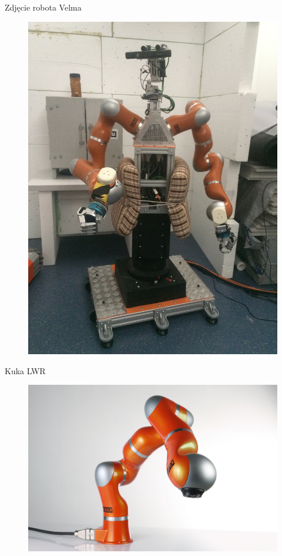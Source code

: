 \documentclass{beamer}
\begin{document}
\begin{frame}{Zdjęcie robota Velma}
	\begin{figure}[h]
		\centering
		\includegraphics[scale=0.055, angle =-90]{velma1}
	\end{figure}
\end{frame}

\begin{frame}{Kuka LWR}
\begin{figure}[h]
	\centering
	\includegraphics[scale=0.5]{kuka}
\end{figure}
\end{frame}
\end{document}

